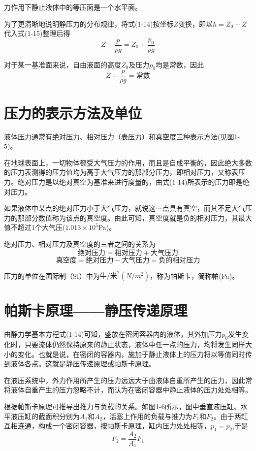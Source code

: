 力作用下静止液体中的等压面是一个水平面。

为了更清晰地说明静压力的分布规律，将式(1-14)按坐标$Z$变换，即以$h=Z_0-Z$代入式(1-15)整理后得
$$Z+\frac{p}{\rho g}=Z_0+\frac{p_0}{\rho g}$$

对于某一基准面来说，自由液面的高度$Z_0$及压力$p_0$均是常数，因此
$$Z+\frac{p}{\rho g}=\text{常数}$$

\section{压力的表示方法及单位}

液体压力通常有绝对压力、相对压力（表压力）和真空度三种表示方法(见图1-5)。

在地球表面上，一切物体都受大气压力的作用，而且是自成平衡的，因此绝大多数的压力表测得的压力值均为高于大气压力的那部分压力，即相对压力，又称表压力。绝对压力是以绝对真空为基准来进行度量的，由式(1-14)所表示的压力即是绝对压力。

如果液体中某点的绝对压力小于大气压力，就说这一点具有真空，而其不足大气压力的那部分数值称为该点的真空度。由此可知，真空度就是负的相对压力，其最大值不超过1个大气压($1.013 \times 10^5$Pa)。

绝对压力、相对压力及真空度的三者之间的关系为
$$ \mbox{绝对压力}=\mbox{相对压力}+\mbox{大气压力}$$
$$ \mbox{真空度}=\mbox{绝对压力}-\mbox{大气压力}=\mbox{负的相对压力}$$

压力的单位在国际制（SI）中为$\mbox{牛}/\mbox{米}^2(N/m^2)$，称为帕斯卡，简称帕(Pa)。

\section{帕斯卡原理——静压传递原理}
由静力学基本方程式(1-14)可知，盛放在密闭容器内的液体，其外加压力$p_0$发生变化时，只要流体仍然保持原来的静止状态，液体中任一点的压力，均将发生同样大小的变化。也就是说，在密闭的容器内，施加于静止液体上的压力将以等值同时传到液体各点。这就是静压传递原理或帕斯卡原理。

在液压系统中，外力作用所产生的压力远远大于由液体自重所产生的压力，因此常将液体自重产生的压力忽略不计，而认为在密闭容器中静止液体的压力处处相等。

根据帕斯卡原理可推导出推力与负载的关系。如图1-6所示，图中垂直液压缸、水平液压缸的截面积分别为$A_1$和$A_2$，活塞上作用的负载与推力为$F_1$和$F_2$。由于两缸互相连通，构成一个密闭容器，按帕斯卡原理，缸内压力处处相等，$p_1=p_2$,于是
\begin{equation}
F_2=\frac{A_2}{A_1}F_1
\end{equation}


